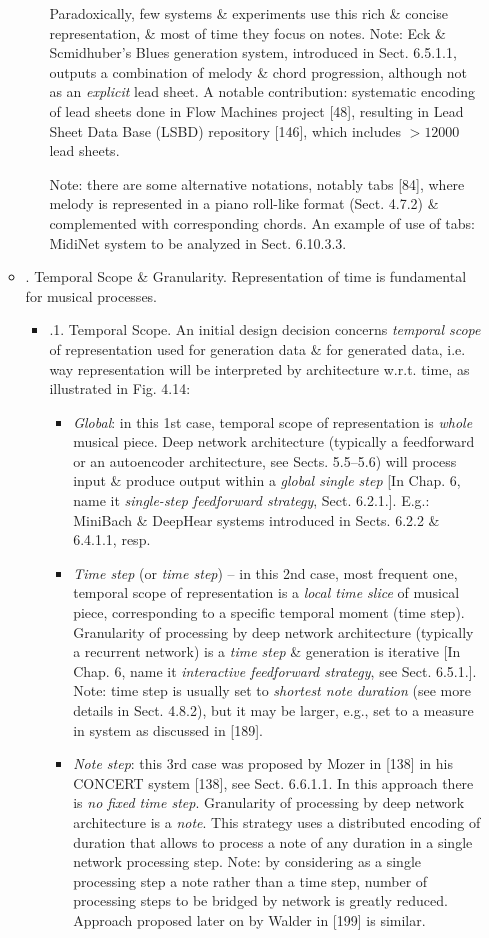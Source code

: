 \documentclass{article}
\begin{document}
\begin{itemize}
\begin{itemize}
\begin{itemize}
			Paradoxically, few systems \& experiments use this rich \& concise representation, \& most of time they focus on notes. Note: {\sc Eck \& Scmidhuber}'s Blues generation system, introduced in Sect. 6.5.1.1, outputs a combination of melody \& chord progression, although not as an {\it explicit} lead sheet. A notable contribution: systematic encoding of lead sheets done in Flow Machines project [48], resulting in Lead Sheet Data Base (LSBD) repository [146], which includes $> 12000$ lead sheets.
			
			Note: there are some alternative notations, notably tabs [84], where melody is represented in a piano roll-like format (Sect. 4.7.2) \& complemented with corresponding chords. An example of use of tabs: MidiNet system to be analyzed in Sect. 6.10.3.3.
		\end{itemize}
		\item {. Temporal Scope \& Granularity.} Representation of time is fundamental for musical processes.
		\begin{itemize}
			\item {.1. Temporal Scope.} An initial design decision concerns {\it temporal scope} of representation used for generation data \& for generated data, i.e. way representation will be interpreted by architecture w.r.t. time, as illustrated in {\sf Fig. 4.14}:
			\begin{itemize}
				\item {\it Global}: in this 1st case, temporal scope of representation is {\it whole} musical piece. Deep network architecture (typically a feedforward or an autoencoder architecture, see Sects. 5.5--5.6) will process input \& produce output within a {\it global single step} [In Chap. 6, name it {\it single-step feedforward strategy}, Sect. 6.2.1.]. E.g.: MiniBach \& DeepHear systems introduced in Sects. 6.2.2 \& 6.4.1.1, resp.
				\item {\it Time step} (or {\it time step}) -- in this 2nd case, most frequent one, temporal scope of representation is a {\it local time slice} of musical piece, corresponding to a specific temporal moment (time step). Granularity of processing by deep network architecture (typically a recurrent network) is a {\it time step} \& generation is iterative [In Chap. 6, name it {\it interactive feedforward strategy}, see Sect. 6.5.1.]. Note: time step is usually set to {\it shortest note duration} (see more details in Sect. 4.8.2), but it may be larger, e.g., set to a measure in system as discussed in [189].
				\item {\it Note step}: this 3rd case was proposed by {\sc Mozer} in [138] in his CONCERT system [138], see Sect. 6.6.1.1. In this approach there is {\it no fixed time step}. Granularity of processing by deep network architecture is a {\it note}. This strategy uses a distributed encoding of duration that allows to process a note of any duration in a single network processing step. Note: by considering as a single processing step a note rather than a time step, number of processing steps to be bridged by network is greatly reduced. Approach proposed later on by {\sc Walder} in [199] is similar.
				

\end{itemize}
\end{itemize}
\end{itemize}
\end{itemize}
\end{document}

